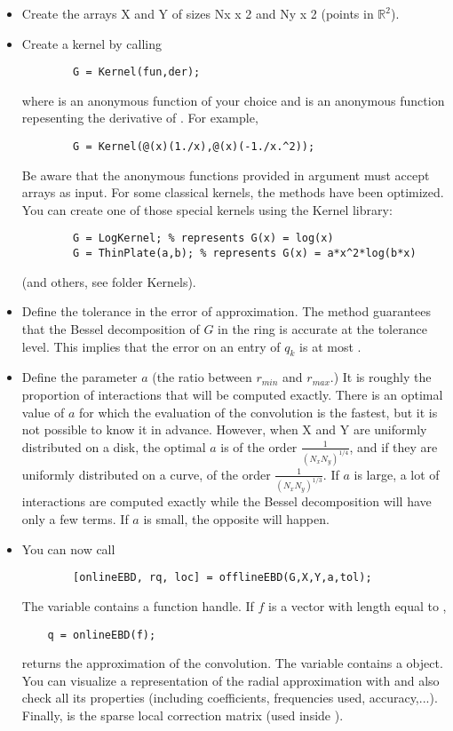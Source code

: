 \documentclass[]{article}
\begin{document}
\begin{itemize}
	\item Create the arrays X and Y of sizes Nx x 2 and Ny x 2 (points in $\mathbb{R}^2$).
	\item Create a kernel by calling
	\begin{lstlisting}
		G = Kernel(fun,der);
	\end{lstlisting}
	where  is an anonymous function of your choice and  is an anonymous function repesenting the derivative of . For example,
	\begin{lstlisting}
		G = Kernel(@(x)(1./x),@(x)(-1./x.^2));
	\end{lstlisting}
	Be aware that the anonymous functions provided in argument must accept arrays as input. For some classical kernels, the methods have been optimized. You can create one of those special kernels using the Kernel library:
	\begin{lstlisting}
		G = LogKernel; % represents G(x) = log(x)
		G = ThinPlate(a,b); % represents G(x) = a*x^2*log(b*x)
	\end{lstlisting}
	(and others, see folder Kernels).
	\item Define the tolerance in the error of approximation. The method guarantees that the Bessel decomposition of $G$ in the ring is accurate at the tolerance level. This implies that the error on an entry of $q_k$ is at most .
	\item Define the parameter $a$ (the ratio between $r_{min}$ and $r_{max}$.) It is roughly the proportion of interactions that will be computed exactly. There is an optimal value of $a$ for which the evaluation of the convolution is the fastest, but it is not possible to know it in advance. However, when X and Y are uniformly distributed on a disk, the optimal $a$ is of the order $\frac{1}{(N_x N_y)^{1/4}}$, and if they are uniformly distributed on a curve, of the order $\frac{1}{(N_x N_y)^{1/3}}$. If $a$ is large, a lot of interactions are computed exactly while the Bessel decomposition will have only a few terms. If $a$ is small, the opposite will happen. 
	\item You can now call 
	\begin{lstlisting}
		[onlineEBD, rq, loc] = offlineEBD(G,X,Y,a,tol);
	\end{lstlisting}
	The variable  contains a function handle. If $f$ is a vector with length equal to , 
	\begin{lstlisting}
	q = onlineEBD(f);
	\end{lstlisting}
	returns the approximation of the convolution. The variable  contains a  object. You can visualize a representation of the radial approximation with  and also check all its properties (including coefficients, frequencies used, accuracy,...). Finally,  is the sparse local correction matrix (used inside ).
	

\end{itemize}
\end{document}
